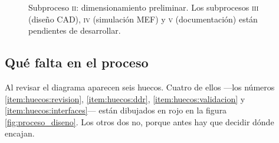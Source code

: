 \begin{figure}[p]
\caption[Subproceso \textsc{ii}: dimensionamiento preliminar]{Subproceso
\textsc{ii}: dimensionamiento preliminar. Los subprocesos \textsc{iii} (diseño
CAD), \textsc{iv} (simulación MEF) y \textsc{v} (documentación) están pendientes
de desarrollar.}
\label{fig:subproceso_dimensionamiento}
\end{figure}

\subsection{Qué falta en el proceso}

Al revisar el diagrama aparecen seis huecos. Cuatro de ellos ---los números
\ref{item:huecos:revision}, \ref{item:huecos:ddr}, \ref{item:huecos:validacion} y
\ref{item:huecos:interfaces}--- están dibujados en rojo en la figura
\ref{fig:proceso_diseno}. Los otros dos no, porque antes hay que decidir dónde
encajan.

